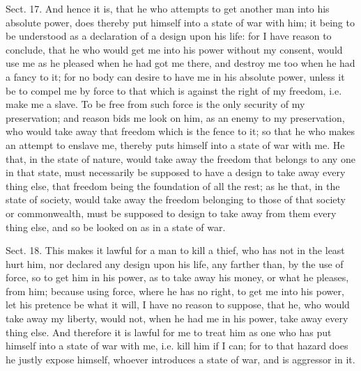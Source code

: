 \documentclass[11pt,openany]{book}
\begin{document}
Sect. 17. And hence it is, that he who attempts to get another man into his absolute power, does thereby put himself into a state of war with him; it being to be understood as a declaration of a design upon his life: for I have reason to conclude, that he who would get me into his power without my consent, would use me as he pleased when he had got me there, and destroy me too when he had a fancy to it; for no body can desire to have me in his absolute power, unless it be to compel me by force to that which is against the right of my freedom, i.e. make me a slave. To be free from such force is the only security of my preservation; and reason bids me look on him, as an enemy to my preservation, who would take away that freedom which is the fence to it; so that he who makes an attempt to enslave me, thereby puts himself into a state of war with me. He that, in the state of nature, would take away the freedom that belongs to any one in that state, must necessarily be supposed to have a design to take away every thing else, that freedom being the foundation of all the rest; as he that, in the state of society, would take away the freedom belonging to those of that society or commonwealth, must be supposed to design to take away from them every thing else, and so be looked on as in a state of war.

Sect. 18. This makes it lawful for a man to kill a thief, who has not in the least hurt him, nor declared any design upon his life, any farther than, by the use of force, so to get him in his power, as to take away his money, or what he pleases, from him; because using force, where he has no right, to get me into his power, let his pretence be what it will, I have no reason to suppose, that he, who would take away my liberty, would not, when he had me in his power, take away every thing else. And therefore it is lawful for me to treat him as one who has put himself into a state of war with me, i.e. kill him if I can; for to that hazard does he justly expose himself, whoever introduces a state of war, and is aggressor in it.
\end{document}
